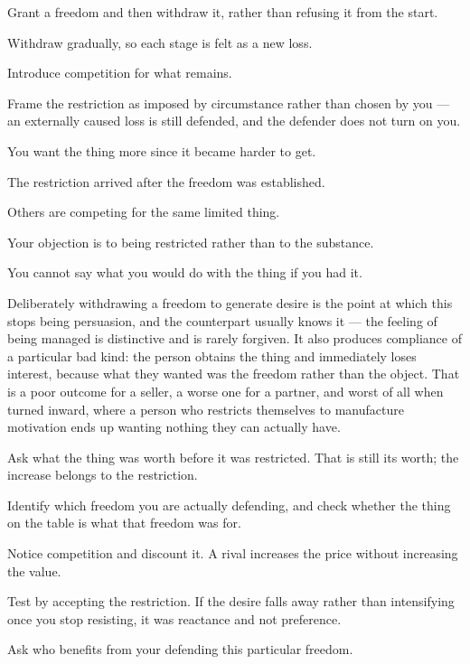 \begin{application}
  \item Grant a freedom and then withdraw it, rather than refusing it from the start.
  \item Withdraw gradually, so each stage is felt as a new loss.
  \item Introduce competition for what remains.
  \item Frame the restriction as imposed by circumstance rather than chosen by you --- an externally caused loss is still defended, and the defender does not turn on you.
\end{application}

\begin{feedback}
  \item You want the thing more since it became harder to get.
  \item The restriction arrived after the freedom was established.
  \item Others are competing for the same limited thing.
  \item Your objection is to being restricted rather than to the substance.
  \item You cannot say what you would do with the thing if you had it.
\end{feedback}

\begin{failure}
Deliberately withdrawing a freedom to generate desire is the point at which this stops being persuasion, and the counterpart usually knows it --- the feeling of being managed is distinctive and is rarely forgiven. It also produces compliance of a particular bad kind: the person obtains the thing and immediately loses interest, because what they wanted was the freedom rather than the object. That is a poor outcome for a seller, a worse one for a partner, and worst of all when turned inward, where a person who restricts themselves to manufacture motivation ends up wanting nothing they can actually have.
\end{failure}

\begin{countermeasures}
  \item Ask what the thing was worth before it was restricted. That is still its worth; the increase belongs to the restriction.
  \item Identify which freedom you are actually defending, and check whether the thing on the table is what that freedom was for.
  \item Notice competition and discount it. A rival increases the price without increasing the value.
  \item Test by accepting the restriction. If the desire falls away rather than intensifying once you stop resisting, it was reactance and not preference.
  \item Ask who benefits from your defending this particular freedom.
\end{countermeasures}

\seesources
{}
